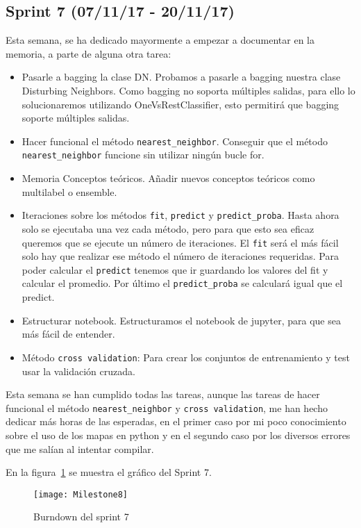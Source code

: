 \subsection{Sprint 7 (07/11/17 - 20/11/17)}
Esta semana, se ha dedicado mayormente a empezar a documentar en la memoria, a parte de alguna otra tarea:
\begin{itemize}
\item Pasarle a bagging la clase DN. Probamos a pasarle a bagging nuestra clase Disturbing Neighbors. Como bagging no soporta múltiples salidas, para ello lo solucionaremos utilizando OneVsRestClassifier, esto permitirá que bagging soporte múltiples salidas.
\item Hacer funcional el método \texttt{nearest\_neighbor}. Conseguir que el método \texttt{nearest\_neighbor} funcione sin utilizar ningún bucle for.
\item Memoria Conceptos teóricos. Añadir nuevos conceptos teóricos como multilabel o ensemble.
\item Iteraciones sobre los métodos \texttt{fit}, \texttt{predict} y \texttt{predict\_proba}. Hasta ahora solo se ejecutaba una vez cada método, pero para que esto sea eficaz queremos que se ejecute un número de iteraciones. El \texttt{fit} será el más fácil solo hay que realizar ese método el número de iteraciones requeridas. Para poder calcular el \texttt{predict} tenemos que ir guardando los valores del fit y calcular el promedio. Por último el \texttt{predict\_proba} se calculará igual que el predict.
\item Estructurar notebook. Estructuramos el notebook de jupyter, para que sea más fácil de entender.
\item Método \texttt{cross validation}: Para crear los conjuntos de entrenamiento y test usar la validación cruzada.
\end{itemize}

Esta semana se han cumplido todas las tareas, aunque las tareas de hacer funcional el método \texttt{nearest\_neighbor} y \texttt{cross validation}, me han hecho dedicar más horas de las esperadas, en el primer caso por mi poco conocimiento sobre el uso de los mapas en python y en el segundo caso por los diversos errores que me salían al intentar compilar.

En la figura~\ref{fig:Milestone8} se muestra el gráfico del Sprint 7.

\begin{figure}
\centering
\texttt{[image: Milestone8]}
\caption{Burndown del sprint 7}
\label{fig:Milestone8}
\end{figure}

